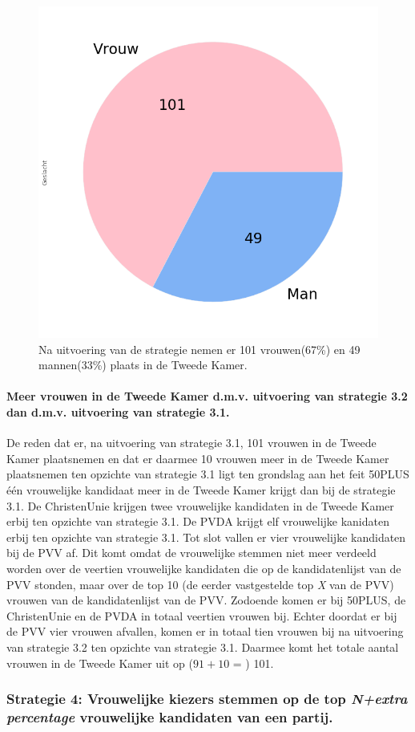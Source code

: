 \begin{figure}[H]
\centering
	\includegraphics[width=0.35\linewidth]{pie_chart_eigenX.png}

			\caption{Na uitvoering van de strategie nemen er 101 vrouwen(67\%) en 49 mannen(33\%) plaats in de Tweede Kamer.}

\label{fig:pcS32V}
\end{figure}

\paragraph{Meer vrouwen in de Tweede Kamer d.m.v. uitvoering van strategie 3.2 dan d.m.v. uitvoering van strategie 3.1.}
De reden dat er, na uitvoering van strategie 3.1, 101 vrouwen in de Tweede Kamer plaatsnemen en dat er daarmee 10 vrouwen meer in de Tweede Kamer plaatsnemen ten opzichte van strategie 3.1 ligt ten grondslag aan het feit 50PLUS één vrouwelijke kandidaat meer in de Tweede Kamer krijgt dan bij de strategie 3.1. 
De ChristenUnie krijgen twee vrouwelijke kandidaten in de Tweede Kamer erbij ten opzichte van strategie 3.1. De PVDA krijgt elf vrouwelijke kanidaten erbij ten opzichte van strategie 3.1. Tot slot vallen er vier vrouwelijke kandidaten bij de PVV af. Dit komt omdat de vrouwelijke stemmen niet meer verdeeld worden over de veertien vrouwelijke kandidaten die op de kandidatenlijst van de PVV stonden, maar over de top 10 (de eerder vastgestelde top \textit{X} van de PVV) vrouwen van de kandidatenlijst van de PVV. Zodoende komen er bij 50PLUS, de ChristenUnie en de PVDA in totaal veertien vrouwen bij. Echter doordat er bij de PVV vier vrouwen afvallen, komen er in totaal tien vrouwen bij na uitvoering van strategie 3.2 ten opzichte van strategie 3.1. Daarmee komt het totale aantal vrouwen in de Tweede Kamer uit op ($91+10$ = ) 101.


\subsubsection{Strategie 4: Vrouwelijke kiezers stemmen op de top \textit{N+extra percentage} vrouwelijke kandidaten van een partij.}

